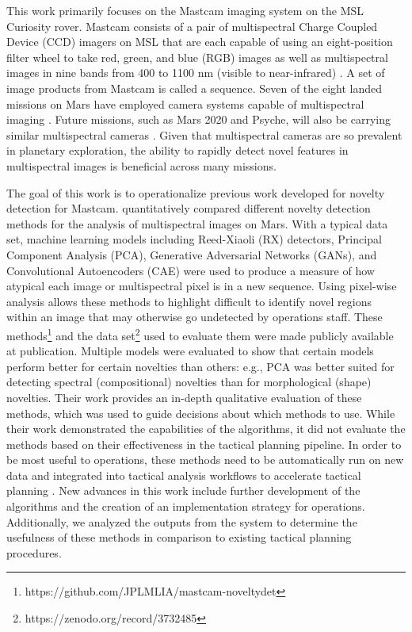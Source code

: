 This work primarily focuses on the Mastcam imaging system on the MSL Curiosity rover.
Mastcam consists of a pair of multispectral Charge Coupled Device (CCD) imagers on MSL that are each capable of using an eight-position filter wheel to take red, green, and blue (RGB) images as well as multispectral images in nine bands from 400 to 1100 nm (visible to near-infrared) \parencite{bell_mastcam}.
A set of image products from Mastcam is called a sequence.
Seven of the eight landed missions on Mars have employed camera systems capable of multispectral imaging \parencite{bell2019tactical}.
Future missions, such as Mars 2020 and Psyche, will also be carrying similar multispectral cameras \parencite{bell2016mastcam} \parencite{bell_psyche}.
Given that multispectral cameras are so prevalent in planetary exploration, the ability to rapidly detect novel features in multispectral images is beneficial across many missions.

The goal of this work is to operationalize previous work developed for novelty detection for Mastcam.
\cite{kerner2020comparison} quantitatively compared different novelty detection methods for the analysis of multispectral images on Mars.
With a typical data set, machine learning models including Reed-Xiaoli (RX) detectors, Principal Component Analysis (PCA), Generative Adversarial Networks (GANs), and Convolutional Autoencoders (CAE) were used to produce a measure of how atypical each image or multispectral pixel is in a new sequence. 
Using pixel-wise analysis allows these methods to highlight difficult to identify novel regions within an image that may otherwise go undetected by operations staff.
These methods\footnote{https://github.com/JPLMLIA/mastcam-noveltydet} and the data set\footnote{https://zenodo.org/record/3732485} used to evaluate them were made publicly available at publication. 
Multiple models were evaluated to show that certain models perform better for certain novelties than others: e.g., PCA was better suited for detecting spectral (compositional) novelties than for morphological (shape) novelties. 
Their work provides an in-depth qualitative evaluation of these methods, which was used to guide decisions about which methods to use. 
While their work demonstrated the capabilities of the algorithms, it did not evaluate the methods based on their effectiveness in the tactical planning pipeline.
In order to be most useful to operations, these methods need to be automatically run on new data and integrated into tactical analysis workflows to accelerate tactical planning \parencite{donahoe2020new}.
New advances in this work include further development of the algorithms and the creation of an implementation strategy for operations. 
Additionally, we analyzed the outputs from the system to determine the usefulness of these methods in comparison to existing tactical planning procedures. 

